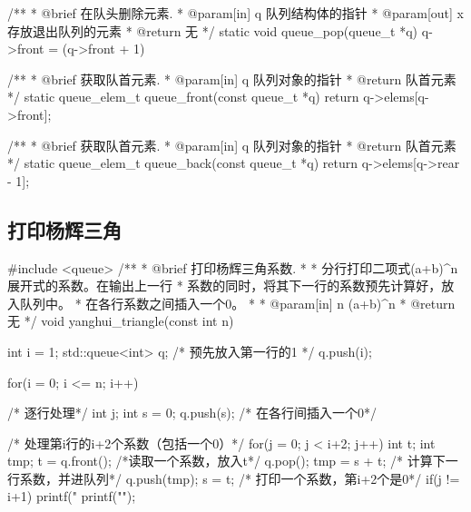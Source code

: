 \begin{Codex}[label=queue.cpp]
/** 
  * @brief 在队头删除元素.
  * @param[in] q 队列结构体的指针
  * @param[out] x 存放退出队列的元素
  * @return 无
  */
static void queue_pop(queue_t *q) {
    q->front = (q->front + 1) %
}

/** 
 * @brief 获取队首元素.
 * @param[in] q 队列对象的指针
 * @return 队首元素
 */
static queue_elem_t queue_front(const queue_t *q) {
    return q->elems[q->front];
}

/** 
 * @brief 获取队首元素.
 * @param[in] q 队列对象的指针
 * @return 队首元素
 */
static queue_elem_t queue_back(const queue_t *q) {
    return q->elems[q->rear - 1];
}
\end{Codex}

\subsection{打印杨辉三角}

\begin{Codex}[label=yanghui_triangle.cpp]
#include <queue>
/**
 * @brief 打印杨辉三角系数.
 *
 * 分行打印二项式(a+b)^n展开式的系数。在输出上一行
 * 系数的同时，将其下一行的系数预先计算好，放入队列中。
 * 在各行系数之间插入一个0。
 *
 * @param[in] n (a+b)^n
 * @return 无
 */
void yanghui_triangle(const int n)
{
    int i = 1;
    std::queue<int> q;
    /* 预先放入第一行的1 */
    q.push(i);

    for(i = 0; i <= n; i++) {	 /* 逐行处理*/
        int j;
        int s = 0;
        q.push(s);      /* 在各行间插入一个0*/

        /* 处理第i行的i+2个系数（包括一个0）*/
        for(j = 0; j < i+2; j++) {
            int t;
            int tmp;
            t = q.front();  /*读取一个系数，放入t*/
            q.pop();
            tmp = s + t;      /* 计算下一行系数，并进队列*/
            q.push(tmp);
            s = t;            /* 打印一个系数，第i+2个是0*/
            if(j != i+1) {
                printf("%
            }
        }
        printf("\n"); 
    }
}
\end{Codex}
